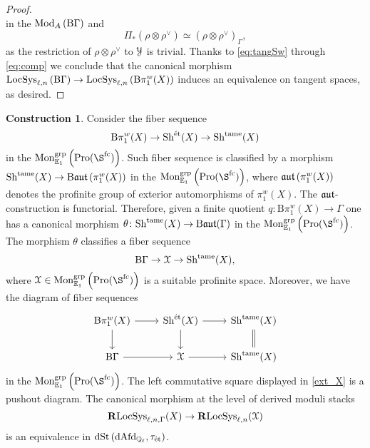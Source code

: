 \documentclass[10pt,a4paper]{amsart}
\numberwithin{equation}{subsection}
\theoremstyle{plain}
\theoremstyle{definition}
\newtheorem{construction}[theorem]{Construction}
\theoremstyle{remark}
\numberwithin{equation}{section}
\begin{document}
\begin{proof}
\begin{equation}
	\end{equation}
in the \infcat $\mathrm{Mod}_A \left( \mathrm B \Gamma \right)$ and 
	\begin{equation} \label{eq:comp}
		\Pi_* \left( \rho \otimes \rho^\vee \right)
		\simeq \left( \rho \otimes \rho^\vee \right)_{\Gamma},
	\end{equation}
as the restriction of $\rho \otimes \rho^\vee$ to $\mathcal Y$ is trivial. Thanks to \eqref{eq:tangSw} through \eqref{eq:comp}
we conclude that the canonical morphism $\mathrm{LocSys}_{\ell, n} \left( \mathrm B \Gamma \right) \to \mathrm{LocSys}_{\ell, n} \left( \mathrm B \pi_1^w(X) \right)$ induces an equivalence on tangent spaces, as desired.
\end{proof}

\begin{construction}
Consider the fiber sequence
	\[
		\mathrm B \pi_1^w(X) \to \mathrm{Sh}^{\text{\'et}}(X) \to \mathrm{Sh}^{\mathrm{tame}}(X)
	\]
in the \infcat $\Mon_{\bE_1}^{\grp} \left( \pro(\S^{\fc})\right)$.
Such fiber sequence is classified by a morphism $\mathrm{Sh}^{\mathrm{tame}}(X) \to \mathrm B \mathfrak{aut} \left( \pi_1^w(X) \right)$ in the \infcat $\Mon_{\bE_1}^{\grp} \left( \pro(\S^{\fc}) \right)$, where $\mathfrak{aut} \left( \pi_1^w(X) \right)$ denotes the profinite group of exterior automorphisms of
$\pi_1^w(X)$. The $\mathfrak{aut} $-construction is functorial. Therefore, given a finite quotient $q \colon \mathrm B \pi_1^w(X) \to \Gamma$ one has a canonical morphism $\theta \colon \mathrm{Sh}^{\mathrm{tame}}(X) \to \mathrm B \mathfrak{aut}( \Gamma )$ in the \infcat
$\Mon_{\bE_1}^{\grp} \left( \pro( \S^{\fc}) \right)$. The morphism $\theta$ classifies a fiber sequence
	\[
		\mathrm B \Gamma \to \mathcal X \to \mathrm{Sh}^{\mathrm{tame}}(X),
	\]
where $\cX \in \Mon_{\bE_1}^{\grp} \left(  \pro( \S^{\fc}) \right)$ is a suitable profinite space. Moreover, we have the diagram of fiber sequences
	\begin{equation} \label{ext_X}
	\begin{tikzcd}
		\mathrm B \pi_1^w(X) \ar{r} \ar{d} &  \Sh^{\et}(X) \ar{r} \ar{d} & \Sh^{\tame}(X) \ar[equal]{d} \\
		\mathrm B \Gamma \ar{r} & \cX \ar{r} & \Sh^{\tame}(X)
	\end{tikzcd}
	\end{equation}
in the \infcat $\Mon_{\mathbb E_1}^{\grp} \left( 	\pro(\S^{\fc}) \right)$. The left commutative square displayed in \eqref{ext_X} is a pushout diagram. The canonical morphism at the level of derived moduli stacks
	\[
		\mathbf R \mathrm{LocSys}_{\ell, n, \Gamma}(X) \to \mathbf R \mathrm{LocSys}_{\ell, n}(\mathcal X)
	\]
is an equivalence in $\mathrm{dSt} \left( \mathrm{dAfd}_{\mathbb{Q}_\ell}, \tau_{\text{\'et}} \right)$.
\end{construction}
\end{document}
